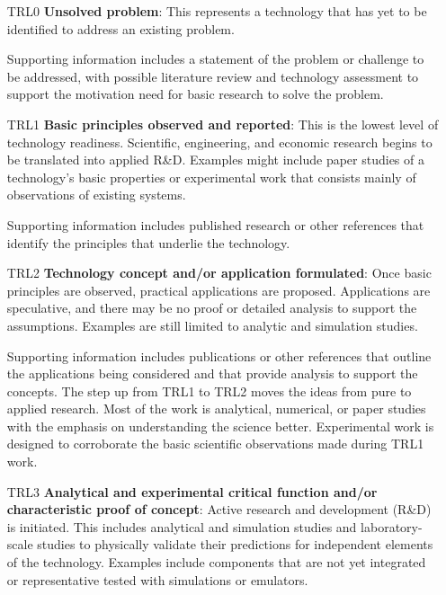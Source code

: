 \documentclass[10pt,twocolumn]{article}
\begin{document}
\begin{enumerate}

    \item[\footnotesize TRL0] \textbf{Unsolved problem}: This represents a technology that has yet to be identified to address an existing problem.
    
    Supporting information includes a statement of the problem or challenge to be addressed, with possible literature review and technology assessment to support the motivation need for basic research to solve the problem.
    
    \item[\footnotesize TRL1] \textbf{Basic principles observed and reported}: This is the lowest level of technology readiness. Scientific, engineering, and economic research begins to be translated into applied R\&D. Examples might include paper studies of a technology's basic properties or experimental work that consists mainly of observations of existing systems. 
    
    Supporting information includes published research or other references that identify the principles that underlie the technology.

    \item[\footnotesize TRL2] \textbf{Technology concept and/or application formulated}: Once basic principles are observed, practical applications are proposed. Applications are speculative, and there may be no proof or detailed analysis to support the assumptions. Examples are still limited to analytic and simulation studies. 
    
    Supporting information includes publications or other references that outline the applications being considered and that provide analysis to support the concepts. The step up from TRL1 to TRL2 moves the ideas from pure to applied research. Most of the work is analytical, numerical, or paper studies with the emphasis on understanding the science better. Experimental work is designed to corroborate the basic scientific observations made during TRL1 work.
    
    \item[\footnotesize TRL3] \textbf{Analytical and experimental critical function and/or characteristic proof of concept}: Active research and development (R\&D) is initiated. This includes analytical and simulation studies and laboratory-scale studies to physically validate their predictions for independent elements of the technology. Examples include components that are not yet integrated or representative tested with simulations or emulators. 
    

\end{enumerate}
\end{document}
